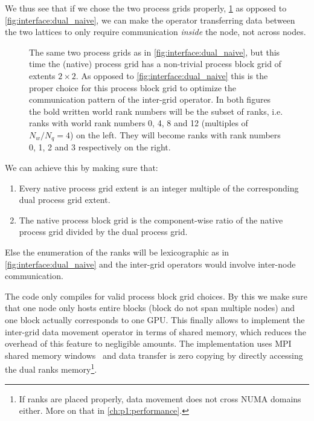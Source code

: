 We thus see that if we chose the two process grids properly, \cref{fig:interface:dual_blk} as opposed to \cref{fig:interface:dual_naive}, we can make the operator transferring data between the two lattices to only require communication \emph{inside} the node, not across nodes.
\begin{figure}
  
  \caption{The same two process grids as in \cref{fig:interface:dual_naive}, but this time the \openqxd (native) process grid has a non-trivial process block grid of extents $2 \times 2$. As opposed to \cref{fig:interface:dual_naive} this is the proper choice for this process block grid to optimize the communication pattern of the inter-grid operator. In both figures the bold written world rank numbers will be the subset of \quda ranks, i.e. ranks with world rank numbers \num{0}, \num{4}, \num{8} and \num{12} (multiples of $N_w/N_q = 4$) on the left. They will become ranks with \quda rank numbers \num{0}, \num{1}, \num{2} and \num{3} respectively on the right.}
  \label{fig:interface:dual_blk}
\end{figure}
We can achieve this by making sure that:
\begin{enumerate}
  \item Every native process grid extent is an integer multiple of the corresponding dual process grid extent.
  \item The native process block grid is the component-wise ratio of the native process grid divided by the dual process grid.
\end{enumerate}
Else the enumeration of the ranks will be lexicographic as in \cref{fig:interface:dual_naive} and the inter-grid operators would involve inter-node communication.

The code only compiles for valid process block grid choices.
By this we make sure that one node only hosts entire blocks (block do not span multiple nodes) and one block actually corresponds to one GPU.
This finally allows to implement the inter-grid data movement operator in terms of shared memory, which reduces the overhead of this feature to negligible amounts.
The implementation uses MPI shared memory windows~\cite{standard:mpi-3.0} and data transfer is zero copying by directly accessing the dual ranks memory\footnote{If ranks are placed properly, data movement does not cross NUMA domains either. More on that in \cref{ch:p1:performance}.}.

